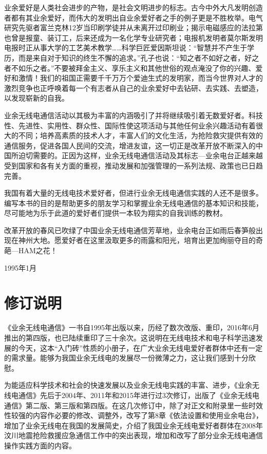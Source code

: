 \documentclass[12pt,UTF8]{ctexbook}
\begin{document}
业余爱好是人类社会进步的产物，是社会文明进步的标志。古今中外大凡发明创造者都有其业余爱好，而伟大的发明出自业余爱好者之手的例子更是不胜枚举。电气研究先驱者富兰克林12岁当印刷学徒并从未离开过印刷业；揭示电磁感应的法拉第也曾是报童、装订工，后来还成为一名化学专业研究者；电报机发明者莫尔斯发明电报时正从事大学的工艺美术教学……科学巨匠爱因斯坦说：“智慧并不产生于学历，而是来自对于知识的终生不懈的追求。”孔子也说：“知之者不如好之者，好之者不如乐之者。”不要被拜金主义、享乐主义和其他世俗的观点淹没了你的兴趣、爱好和激情！我们的祖国正需要千千万万个爱迪生式的发明家，而当今世界对人才的激烈竞争也正呼唤着每一个有志者从自己的业余爱好中去钻研、去实践、去塑造，以发现崭新的自我。

业余无线电通信活动以其极为丰富的内涵吸引了并将继续吸引着无数爱好者。科技性、先进性、实用性、群众性、国际性使这项活动与其他任何业余兴趣活动有着很大的不同；培养高素质的技术人才，丰富人们的文化生活，为抢险救灾提供有效的通信服务，促进各国人民间的交流，增进友谊，这一切正是改革开放不断深入的中国所迫切需要的。正因为这样，业余无线电通信活动及其标志—业余电台正越来越受到国家和各有关方面的重视，推动发展和加强管理的一系列法规、政策也已日趋完善。

我国有着大量的无线电技术爱好者，但进行业余无线电通信实践的人还不是很多。编写本书的目的是帮助更多的朋友学习和掌握业余无线电通信的基本知识和技能，尽可能地为乐于此道的爱好者们提供一本较为翔实的自我训练的教材。

改革开放的春风已吹绿了中国业余无线电通信芳草地，业余电台正如雨后春笋般出现在神州大地。愿爱好者在这里汲取更多的雨露和阳光，培育出更加绚丽夺目的奇葩—HAM之花！

1995年1月

\chapter{修订说明}

《业余无线电通信》一书自1995年出版以来，历经了数次改版、重印，2016年6月推出的第四版，也已陆续重印了三十余次。这说明在无线电技术和电子科学迅速发展的今天，这本“入门砖”性质的小册子，在广大业余无线电爱好者群体中还有一定的需求量。能够为我国业余无线电的发展尽一份微薄之力，这让我们感到十分欣慰。

为能适应科学技术和社会的快速发展以及业余无线电实践的丰富、进步，《业余无线电通信》先后于2004年、2011年和2015年进行过3次修订，出版了《业余无线电通信》第二版、第三版和第四版。在这几次修订中，除了对正文和附录里一些时效性较强的内容作必要的修改、调整外，改写了第8章《依法设置和使用业余电台》，增加了业余无线电在我国的发展简史，介绍了我国业余无线电爱好者群体在2008年汶川地震抢险救援应急通信工作中的突出表现，增加和改写了部分业余无线电通信操作实践方面的内容。
\end{document}
